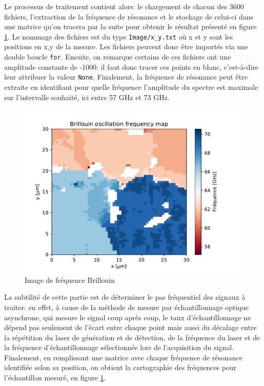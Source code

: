 \documentclass[a4paper, 11pt]{article}
\begin{document}
Le processus de traitement contient alors: le chargement de chacun des 3600 fichiers, l'extraction de la fréquence de résonance et le stockage de celui-ci dans une matrice qu'on tracera par la suite pour obtenir le résultat présenté en figure \ref{fig:tds2}. Le nommage des fichiers est du type \verb|Image/x_y.txt| où x et y sont les positions en x,y de la mesure. Les fichiers peuvent donc être importés via une double boucle \verb|for|. Ensuite, on remarque certains de ces fichiers ont une amplitude constante de -1000: il faut donc tracer ces points en blanc, c'est-à-dire leur attribuer la valeur \verb|None|. Finalement, la fréquence de résonance peut être extraite en identifiant pour quelle fréquence l'amplitude du spectre est maximale sur l'intervalle souhaité, ici entre 57 GHz et 73 GHz.

\begin{figure}[H]
	\centering
	\includegraphics[scale=0.8]{Figures/Brillouin_freq_map.pdf}
	\caption{Image de fréquence Brillouin}
	\label{fig:tds2} 
\end{figure}

La subtilité de cette partie est de déterminer le pas fréquentiel des signaux à traiter: en effet, à cause de la méthode de mesure par échantillonnage optique asynchrone, qui mesure le signal coup après coup, le taux d'échantillonnage ne dépend pas seulement de l'écart entre chaque point mais aussi du décalage entre la répétition du laser de génération et de détection, de la fréquence du laser et de la fréquence d'échantillonnage sélectionnée lors de l'acquisition du signal. Finalement, en remplissant une matrice avec chaque fréquence de résonance identifiée selon sa position, on obtient la cartographie des fréquences pour l'échantillon mesuré, en figure \ref{fig:tds2}.\\
\end{document}
